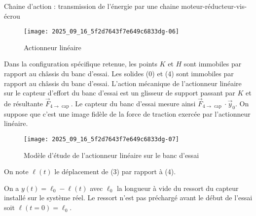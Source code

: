 Chaine d'action : transmission de l'énergie par une chaine moteur-réducteur-vis-écrou



\begin{figure}[!h]
\centering
\texttt{[image: 2025\_09\_16\_5f2d7643f7e649c6833dg-06]}
\caption{\label{ccs_mp_2023_fig_09} Actionneur linéaire }
\end{figure}


Dans la configuration spécifique retenue, les points $K$ et $H$ sont immobiles par rapport au châssis du banc d'essai. Les solides (0) et (4) sont immobiles par rapport au châssis du banc d'essai. L'action mécanique de l'actionneur linéaire sur le capteur d'effort du banc d'essai est un glisseur de support passant par $K$ et de résultante $\vec{F}_{4 \rightarrow \text { cap }}$. Le capteur du banc d'essai mesure ainsi $\vec{F}_{4 \rightarrow \text { cap }} \cdot \vec{y}_{0}$. On suppose que c'est une image fidèle de la force de traction exercée par l'actionneur linéaire.



\begin{figure}[!h]
\centering
\texttt{[image: 2025\_09\_16\_5f2d7643f7e649c6833dg-07]}
\caption{\label{ccs_mp_2023_fig_10}  Modèle d'étude de l'actionneur linéaire sur le banc d'essai}
\end{figure}



On note $\ell(t)$ le déplacement de (3) par rapport à (4).

On a $y(t)=\ell_{0}-\ell(t)$ avec $\ell_{0}$ la longueur à vide du ressort du capteur installé sur le système réel. Le ressort n'est pas préchargé avant le début de l'essai soit $\ell(t=0)=\ell_{0}$.

